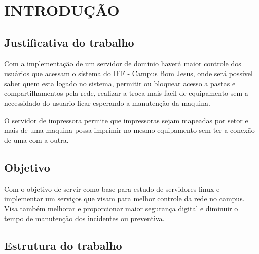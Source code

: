 \chapter{INTRODUÇÃO}

\section{Justificativa do trabalho}

Com a implementação de um servidor de dominio haverá maior controle dos usuários que acessam o sistema do IFF - Campus Bom Jesus, onde será possivel saber quem esta logado no sistema, permitir ou bloquear acesso a pastas e compartilhamentos pela rede, realizar a troca mais facil de equipamento sem a necessidado do usuario ficar esperando a manutenção da maquina.

O servidor de impressora permite que impressoras sejam mapeadas por setor e mais de uma maquina possa imprimir no mesmo equipamento sem ter a conexão de uma com a outra.

\section{Objetivo}

Com o objetivo de servir como base para estudo de servidores linux e implementar um serviços que visam para melhor controle da rede no campus. Visa também melhorar e proporcionar maior segurança digital e diminuir o tempo de manutenção dos incidentes ou preventiva.

\section{Estrutura do trabalho}

